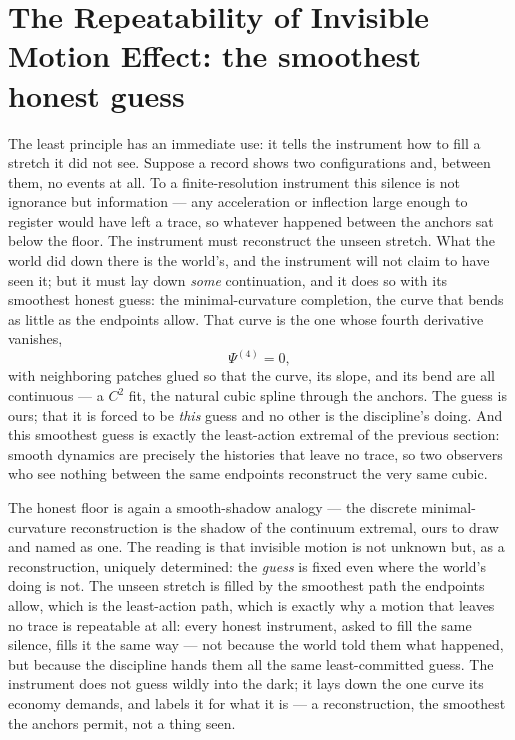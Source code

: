 \section{The Repeatability of Invisible Motion Effect: the smoothest honest guess}
\label{se:repeatability}

The least principle has an immediate use: it tells the instrument how to fill a stretch it did not see.
Suppose a record shows two configurations and, between them, no events at all. To a finite-resolution
instrument this silence is not ignorance but information --- any acceleration or inflection large enough to
register would have left a trace, so whatever happened between the anchors sat below the floor. The
instrument must reconstruct the unseen stretch. What the world did down there is the world's, and the
instrument will not claim to have seen it; but it must lay down \emph{some} continuation, and it does so with
its smoothest honest guess: the minimal-curvature completion, the curve that bends as little as the endpoints
allow. That curve is the one whose fourth derivative vanishes,
\begin{equation}
  \Psi^{(4)} = 0,
\end{equation}
with neighboring patches glued so that the curve, its slope, and its bend are all continuous --- a $C^2$ fit,
the natural cubic spline through the anchors. The guess is ours; that it is forced to be \emph{this} guess and
no other is the discipline's doing. And this smoothest guess is exactly the least-action extremal of the
previous section: smooth dynamics are precisely the histories that leave no trace, so two observers who see
nothing between the same endpoints reconstruct the very same cubic.

The honest floor is again a smooth-shadow analogy --- the discrete minimal-curvature reconstruction is the
shadow of the continuum extremal, ours to draw and named as one. The reading is that invisible motion is not
unknown but, as a reconstruction, uniquely determined: the \emph{guess} is fixed even where the world's doing
is not. The unseen stretch is filled by the smoothest path the endpoints allow, which is the least-action
path, which is exactly why a motion that leaves no trace is repeatable at all: every honest instrument, asked
to fill the same silence, fills it the same way --- not because the world told them what happened, but because
the discipline hands them all the same least-committed guess. The instrument does not guess wildly into the
dark; it lays down the one curve its economy demands, and labels it for what it is --- a reconstruction, the
smoothest the anchors permit, not a thing seen.

